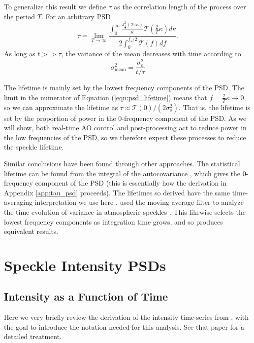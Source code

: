 \documentclass[11pt,preprint]{aastex}
\begin{document}
To generalize this result we define $\tau$ as the correlation length of the process over the period $T$.  For an arbitrary PSD
\begin{equation}
\tau = \lim_{T\to\infty}\frac{ \displaystyle\int_0^{\infty} \frac{ J_{\frac{1}{2}}^2(2\pi \kappa)}{\kappa} \mathcal{T}\left( \frac{2}{T} \kappa \right) d\kappa}{ 2 \displaystyle\int_{0}^{f_s/2} \mathcal{T}(f) df}.
\label{eqn:psd_lifetime}
\end{equation}
As long as $t >> \tau$, the variance of the mean decreases with time according to
\begin{equation}
\sigma_\mathrm{mean}^2 =  \frac{\sigma_o^2}{t/\tau}
\end{equation}

The lifetime is mainly set by the lowest frequency components of the PSD.  The limit in the numerator of Equation (\ref{eqn:psd_lifetime}) means that $f = \frac{2}{T}\kappa \rightarrow 0$, so we can approximate the lifetime as $\tau \approx \mathcal{T}(0)/(2\sigma_o^2)$.  That is, the lifetime is set by the proportion of power in the 0-frequency component of the PSD.  As we will show, both real-time AO control and post-processing act to reduce power in the low frequencies of the PSD, so we therefore expect these processes to reduce the speckle lifetime.

Similar conclusions have been found through other approaches.  The statistical lifetime can be found from the integral of the autocovariance \citep{1986JOSAA...3.1001A}, which gives the 0-frequency component of the PSD (this is essentially how the derivation in Appendix \ref{app:tau_psd} proceeds).  The lifetimes so derived have the same time-averaging interpretation we use here \citep{2006ApJ...637..541F}.  \citet{2006OExpr..14.7499P} used the moving average filter to analyze the time evolution of variance in atmospheric speckles \citep[see also][]{2005SPIE.5903..170M}.  This likewise selects the lowest frequency components as integration time grows, and so produces equivalent results.

\section{Speckle Intensity PSDs}

\subsection{Intensity as a Function of Time}
Here we very briefly review the derivation of the intensity time-series from \citet{2018JATIS...4a9001M}, with the goal to introduce the notation needed for this analysis.  See that paper for a detailed treatment.
\end{document}
